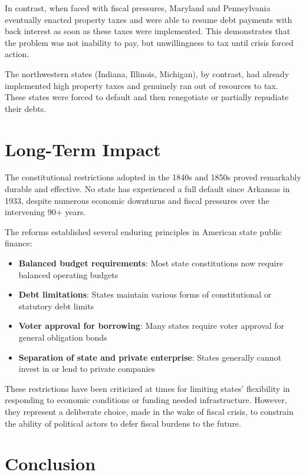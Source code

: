 \documentclass[12pt]{article}
\begin{document}
In contrast, when faced with fiscal pressures, Maryland and Pennsylvania eventually enacted property taxes and were able to resume debt payments with back interest as soon as these taxes were implemented. This demonstrates that the problem was not inability to pay, but unwillingness to tax until crisis forced action.

The northwestern states (Indiana, Illinois, Michigan), by contrast, had already implemented high property taxes and genuinely ran out of resources to tax. These states were forced to default and then renegotiate or partially repudiate their debts.

\section{Long-Term Impact}

The constitutional restrictions adopted in the 1840s and 1850s proved remarkably durable and effective. No state has experienced a full default since Arkansas in 1933, despite numerous economic downturns and fiscal pressures over the intervening 90+ years.

The reforms established several enduring principles in American state public finance:

\begin{itemize}
\item \textbf{Balanced budget requirements}: Most state constitutions now require balanced operating budgets
\item \textbf{Debt limitations}: States maintain various forms of constitutional or statutory debt limits
\item \textbf{Voter approval for borrowing}: Many states require voter approval for general obligation bonds
\item \textbf{Separation of state and private enterprise}: States generally cannot invest in or lend to private companies
\end{itemize}

These restrictions have been criticized at times for limiting states' flexibility in responding to economic conditions or funding needed infrastructure. However, they represent a deliberate choice, made in the wake of fiscal crisis, to constrain the ability of political actors to defer fiscal burdens to the future.

\section{Conclusion}
\end{document}

